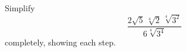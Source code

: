 Simplify
\[
\dfrac{2\sqrt5\,\sqrt[4]{2}\,\sqrt[4]{3^2}}{6\sqrt[4]{3^4}}
\]
completely, showing each step.
